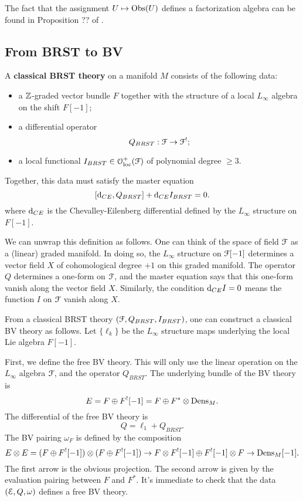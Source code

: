 \documentclass[10pt, oneside]{article}
\begin{document}
The fact that the assignment $U \mapsto \mathrm{Obs}(U)$ defines a factorization algebra can be found in Proposition ?? of \cite{CG2}. 

\subsection{From BRST to BV}

\begin{dfn}
A {\bf classical BRST theory} on a manifold $M$ consists of the following data:
\begin{itemize}
\item a $\mathbb Z$-graded vector bundle $F$ together with the structure of a local $L_\infty$ algebra on the shift $F[-1]$;
\item a differential operator
\[
Q_{BRST} : \mathcal F \to \mathcal F^!  ;
\]
\item a local functional $I_{BRST} \in \mathcal{O}_{\rm loc}^+(\mathcal F)$ of polynomial degree $\geq 3$.
\end{itemize}
Together, this data must satisfy the master equation
\[
[{\rm d}_{CE}, Q_{BRST}] + {\rm d}_{CE} I_{BRST} = 0 .
\]
where ${\rm d}_{CE}$ is the Chevalley-Eilenberg differential defined by the $L_\infty$ structure on $F[-1]$. 
\end{dfn}

We can unwrap this definition as follows. 
One can think of the space of field $\mathcal F$ as a (linear) graded manifold.
In doing so, the $L_\infty$ structure on $\mathcal F[-1]$ determines a vector field $X$ of cohomological degree $+1$ on this graded manifold. 
The operator $Q$ determines a one-form on $\mathcal F$, and the master equation says that this one-form vanish along the vector field $X$. 
Similarly, the condition ${\rm d}_{CE} I = 0$ means the function $I$ on $\mathcal F$ vanish along $X$. 

From a classical BRST theory $(\mathcal F, Q_{BRST}, I_{BRST})$, one can construct a classical BV theory as follows. 
Let $\{\ell_k\}$ be the $L_\infty$ structure maps underlying the local Lie algebra $F[-1]$. 

First, we define the free BV theory. 
This will only use the linear operation on the $L_\infty$ algebra $\mathcal F$, and the operator $Q_{BRST}$. 
The underlying bundle of the BV theory is
\[
E = F \oplus F^! [-1] = F \oplus F^* \otimes {\rm Dens}_M .
\]
The differential of the free BV theory is
\[
Q = \ell_1 + Q_{BRST} .
\]
The BV pairing $\omega_{F}$ is defined by the composition
\[
E \otimes E = (F \oplus F^![-1]) \otimes (F \oplus F^![-1]) \to F \otimes F^! [-1] \oplus F^![-1] \otimes F \to {\rm Dens}_M [-1] .
\]
The first arrow is the obvious projection. 
The second arrow is given by the evaluation pairing between $F$ and $F^*$. 
It's immediate to check that the data $(\mathcal E, Q, \omega)$ defines a free BV theory. 
\end{document}

